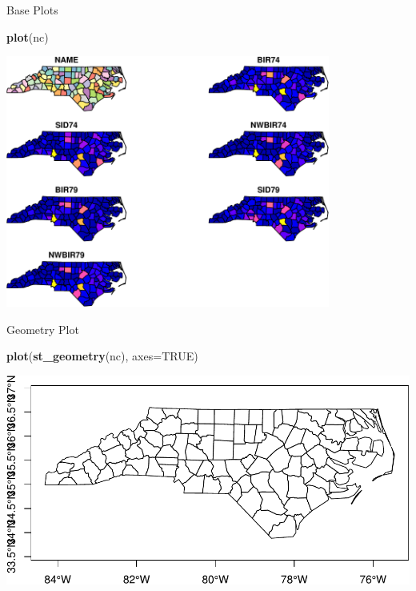 \documentclass[11pt,ignorenonframetext,]{beamer}
\newenvironment{Shaded}{}{}
\newcommand{\DataTypeTok}[1]{\textcolor[rgb]{0.56,0.13,0.00}{#1}}
\newcommand{\KeywordTok}[1]{\textcolor[rgb]{0.00,0.44,0.13}{\textbf{#1}}}
\newcommand{\NormalTok}[1]{#1}
\newcommand{\OtherTok}[1]{\textcolor[rgb]{0.00,0.44,0.13}{#1}}
\let\oldShaded\Shaded
\let\endoldShaded\endShaded
\renewenvironment{Shaded}{\footnotesize\begin{spacing}{0.9}\oldShaded}{\endoldShaded\end{spacing}}
\let\oldverbatim\verbatim
\let\endoldverbatim\endverbatim
\newcommand{\scriptoutput}{
  \renewenvironment{Shaded}{\scriptsize\begin{spacing}{0.9}\oldShaded}{\endoldShaded\end{spacing}}
  \renewenvironment{verbatim}{\scriptsize\begin{spacing}{0.9}\oldverbatim}{\endoldverbatim\end{spacing}}
}
\begin{document}
\begin{frame}[fragile,t]{Base Plots}
\protect\hypertarget{base-plots}{}

\scriptoutput

\begin{Shaded}
\begin{Highlighting}[]
\KeywordTok{plot}\NormalTok{(nc)}
\end{Highlighting}
\end{Shaded}

\begin{center}\includegraphics[width=0.8\textwidth]{Lec16_files/figure-beamer/unnamed-chunk-2-1} \end{center}

\end{frame}

\begin{frame}[fragile,t]{Geometry Plot}
\protect\hypertarget{geometry-plot}{}

\scriptoutput

\begin{Shaded}
\begin{Highlighting}[]
\KeywordTok{plot}\NormalTok{(}\KeywordTok{st_geometry}\NormalTok{(nc), }\DataTypeTok{axes=}\OtherTok{TRUE}\NormalTok{)}
\end{Highlighting}
\end{Shaded}

\begin{center}\includegraphics[width=\textwidth]{Lec16_files/figure-beamer/unnamed-chunk-3-1} \end{center}

\end{frame}
\end{document}

